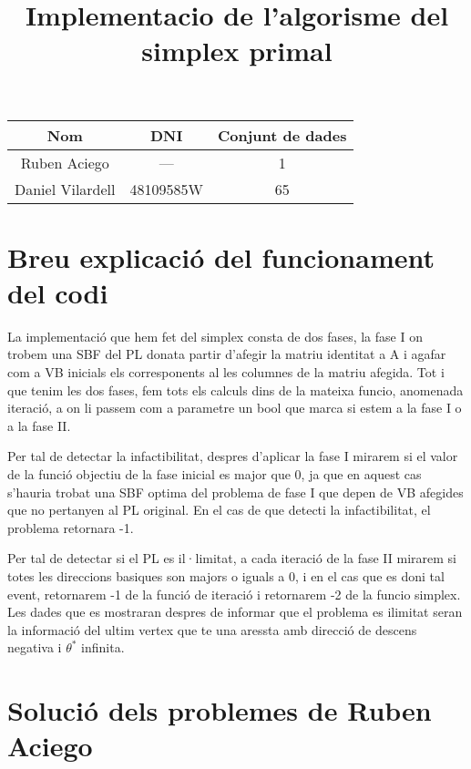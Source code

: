 \documentclass[12pt, a4papre]{article}
\author{}
\title{Implementacio de l’algorisme del simplex primal}
\date{}
\begin{document}
	\maketitle
	\begin{center}
		\begin{tabular}{ |c | c  c |}
			\hline
			\textbf{Nom} 		& \textbf{DNI}		& \textbf{Conjunt de dades} \\ \hline
			Ruben Aciego 		&--- 		 		& 1  			\\ 
			Daniel Vilardell 		&48109585W 		& 65\\
			\hline
		\end{tabular}
	\end{center}
	\tableofcontents
	
	\newpage
	
	\section{Breu explicació del funcionament del codi}
	
	La implementació que hem fet del simplex consta de dos fases, la fase I on trobem una SBF del PL donata partir d'afegir la matriu identitat a A i agafar com a VB inicials els corresponents al les columnes de la matriu afegida. Tot i que tenim les dos fases, fem tots els calculs dins de la mateixa funcio, anomenada iteració, a on li passem com a parametre un bool que marca si estem a la fase I o a la fase II.
	
	Per tal de detectar la infactibilitat, despres d'aplicar la fase I mirarem si el valor de la funció objectiu de la fase inicial es major que 0, ja que en aquest cas s'hauria trobat una SBF optima del problema de fase I que depen de VB afegides que no pertanyen al PL original. En el cas de que detecti la infactibilitat, el problema retornara -1.
	
	Per tal de detectar si el PL es il·limitat, a cada iteració de la fase II mirarem si totes les direccions basiques son majors o iguals a 0, i en el cas que es doni tal event, retornarem -1 de la funció de iteració i retornarem -2 de la funcio simplex. Les dades que es mostraran despres de informar que el problema es ilimitat seran la informació del ultim vertex que te una aressta amb direcció de descens negativa i $\theta^*$ infinita.
	
	\newpage
	\section{Solució dels problemes de Ruben Aciego}
	
\end{document}
